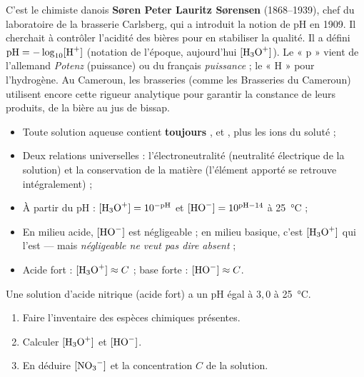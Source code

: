 \documentclass[11pt]{article}
\newcommand{\cle}[1]{{\popxbold\color{popdark}#1}}
\begin{document}
\begin{savaistu}
C'est le chimiste danois \textbf{Søren Peter Lauritz Sørensen} (1868--1939), chef du laboratoire de la brasserie Carlsberg, qui a introduit la notion de pH en 1909. Il cherchait à contrôler l'acidité des bières pour en stabiliser la qualité. Il a défini $\mathrm{pH} = -\log_{10}[\ce{H+}]$ (notation de l'époque, aujourd'hui $[\ce{H3O+}]$). Le « p » vient de l'allemand \emph{Potenz} (puissance) ou du français \emph{puissance} ; le « H » pour l'hydrogène. Au Cameroun, les brasseries (comme les Brasseries du Cameroun) utilisent encore cette rigueur analytique pour garantir la constance de leurs produits, de la bière au jus de bissap.
\end{savaistu}

\begin{aretenir}
\begin{itemize}
\item Toute solution aqueuse contient \textbf{toujours} ,  et , plus les ions du soluté ;
\item Deux relations universelles : l'\cle{électroneutralité} (neutralité électrique de la solution) et la \cle{conservation de la matière} (l'élément apporté se retrouve intégralement) ;
\item À partir du pH : $[\ce{H3O+}] = 10^{-\mathrm{pH}}$ et $[\ce{HO-}] = 10^{\mathrm{pH}-14}$ à \SI{25}{\celsius} ;
\item En milieu acide, $[\ce{HO-}]$ est négligeable ; en milieu basique, c'est $[\ce{H3O+}]$ qui l'est — mais \emph{négligeable ne veut pas dire absent} ;
\item Acide fort : $[\ce{H3O+}] \approx C$ ; base forte : $[\ce{HO-}] \approx C$.
\end{itemize}
\end{aretenir}

\begin{exercice}
Une solution d'acide nitrique  (acide fort) a un pH égal à $3,0$ à \SI{25}{\celsius}.
\begin{enumerate}
\item Faire l'inventaire des espèces chimiques présentes.
\item Calculer $[\ce{H3O+}]$ et $[\ce{HO-}]$.
\item En déduire $[\ce{NO3-}]$ et la concentration $C$ de la solution.
\end{enumerate}
\end{exercice}
\end{document}

